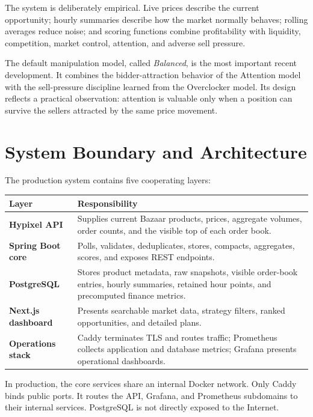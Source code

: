 \documentclass[11pt,a4paper]{article}
\begin{document}
The system is deliberately empirical. Live prices describe the current opportunity;
hourly summaries describe how the market normally behaves; rolling averages reduce noise;
and scoring functions combine profitability with liquidity, competition, market control,
attention, and adverse sell pressure.

The default manipulation model, called \emph{Balanced}, is the most important recent
development. It combines the bidder-attraction behavior of the Attention model with the
sell-pressure discipline learned from the Overclocker model. Its design reflects a practical
observation: attention is valuable only when a position can survive the sellers attracted by
the same price movement.

\section{System Boundary and Architecture}

The production system contains five cooperating layers:

\begin{center}
\begin{tabularx}{\textwidth}{>{\raggedright\arraybackslash\bfseries}p{}X}
\toprule
Layer & Responsibility\\
\midrule
Hypixel API & Supplies current Bazaar products, prices, aggregate volumes, order counts,
and the visible top of each order book.\\
Spring Boot core & Polls, validates, deduplicates, stores, compacts, aggregates, scores,
and exposes REST endpoints.\\
PostgreSQL & Stores product metadata, raw snapshots, visible order-book entries, hourly
summaries, retained hour points, and precomputed finance metrics.\\
Next.js dashboard & Presents searchable market data, strategy filters, ranked opportunities,
and detailed plans.\\
Operations stack & Caddy terminates TLS and routes traffic; Prometheus collects application
and database metrics; Grafana presents operational dashboards.\\
\bottomrule
\end{tabularx}
\end{center}

In production, the core services share an internal Docker network. Only Caddy binds public
ports. It routes the API, Grafana, and Prometheus subdomains to their internal services.
PostgreSQL is not directly exposed to the Internet.
\end{document}
